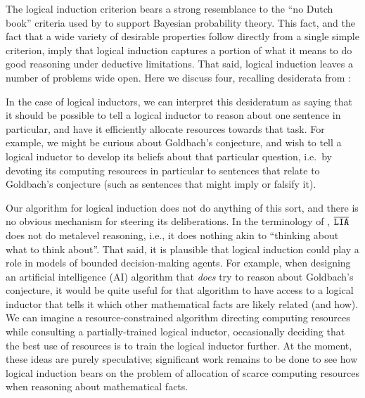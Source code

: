 \documentclass[authordate,onecolumn,noenvironments]{miri-tech-article}
\numberwithin{equation}{subsection}
\newcommand{\seq}[1]{{\overline{#1}}}
\newcommand{\rparenthetical}[1]{\hfill\upshape{{\small (#1)}}} %
\newcommand{\LIA}{\text{\upshape{\texttt{LIA}}}\xspace}
\begin{document}
The logical induction criterion bears a strong resemblance to the ``no Dutch book'' criteria used by \citet{Ramsey:1931,DeFinetti:1937:foresight,teller1973conditionalization,lewis1999papers} to support Bayesian probability theory. This fact, and the fact that a wide variety of desirable properties follow directly from a single simple criterion, imply that logical induction captures a portion of what it means to do good reasoning under deductive limitations. That said, logical induction leaves a number of problems wide open. Here we discuss four, recalling desiderata from :

\renewcommand{\rparenthetical}[1]{}
\desdes*

\noindent In the case of logical inductors, we can interpret this desideratum as saying that it should be possible to tell a logical inductor to reason about one sentence in particular, and have it efficiently allocate resources towards that task. For example, we might be curious about Goldbach's conjecture, and wish to tell a logical inductor to develop its beliefs about that particular question, i.e.\ by devoting its computing resources in particular to sentences that relate to Goldbach's conjecture (such as sentences that might imply or falsify it).

Our algorithm for logical induction does not do anything of this sort, and there is no obvious mechanism for steering its deliberations. In the terminology of \citet{Hay:2012:Selecting}, $\seq\LIA$ does not do metalevel reasoning, i.e., it does nothing akin to ``thinking about  what to think about''. That said, it is plausible that logical induction could play a role in models of bounded decision-making agents. For example, when designing an artificial intelligence (AI) algorithm that \emph{does} try to reason about Goldbach's conjecture, it would be quite useful for that algorithm to have access to a logical inductor that tells it which other mathematical facts are likely related (and how). We can imagine a resource-constrained algorithm directing computing resources while consulting a partially-trained logical inductor, occasionally deciding that the best use of resources is to train the logical inductor further. At the moment, these ideas are purely speculative; significant work remains to be done to see how logical induction bears on the problem of allocation of scarce computing resources when reasoning about mathematical facts.

\descounterp*
\end{document}
